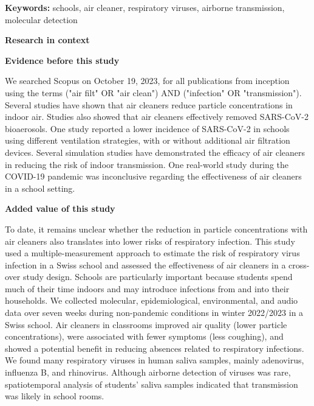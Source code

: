 \documentclass[fleqn,11pt]{wlscirep}
\begin{document}
\flushbottom
\maketitle

\vspace{2em}

\vspace{0.5em}

\noindent\textbf{Keywords:} schools, air cleaner, respiratory viruses, airborne transmission, molecular detection

\thispagestyle{empty}
\sloppy
\raggedbottom

\newpage

\noindent\textbf{\Large{Research in context}} \medskip

\noindent \textbf{Evidence before this study} \smallskip

\noindent We searched Scopus on October 19, 2023, for all publications from inception using the terms ("air filt" OR "air clean") AND ("infection" OR "transmission"). Several studies have shown that air cleaners reduce particle concentrations in indoor air. Studies also showed that air cleaners effectively removed SARS-CoV-2 bioaerosols. One study reported a lower incidence of SARS-CoV-2 in schools using different ventilation strategies, with or without additional air filtration devices. Several simulation studies have demonstrated the efficacy of air cleaners in reducing the risk of indoor transmission. One real-world study during the COVID-19 pandemic was inconclusive regarding the effectiveness of air cleaners in a school setting. \medskip

\noindent \textbf{Added value of this study} \smallskip

\noindent To date, it remains unclear whether the reduction in particle concentrations with air cleaners also translates into lower risks of respiratory infection. This study used a multiple-measurement approach to estimate the risk of respiratory virus infection in a Swiss school and assessed the effectiveness of air cleaners in a cross-over study design. Schools are particularly important because students spend much of their time indoors and may introduce infections from and into their households. We collected molecular, epidemiological, environmental, and audio data over seven weeks during non-pandemic conditions in winter 2022/2023 in a Swiss school. Air cleaners in classrooms improved air quality (lower particle concentrations), were associated with fewer symptoms (less coughing), and showed a potential benefit in reducing absences related to respiratory infections. We found many respiratory viruses in human saliva samples, mainly adenovirus, influenza B, and rhinovirus. Although airborne detection of viruses was rare, spatiotemporal analysis of students' saliva samples indicated that transmission was likely in school rooms. \medskip
\end{document}

